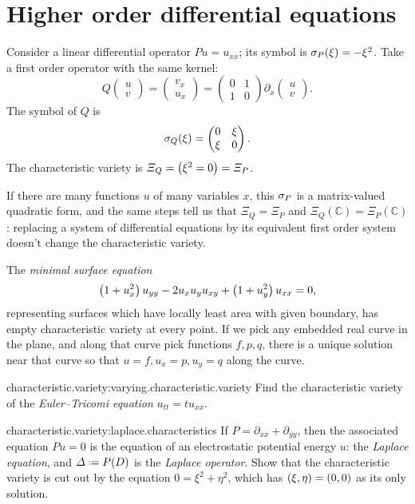 \section{Higher order differential equations}
\begin{example}
Consider a linear differential operator \(Pu=u_{xx}\); its symbol is \(\opsymbol[P]{\xi}=-\xi^2\).
Take a first order operator with the same kernel:
\[
Q
\begin{pmatrix}
u \\
v
\end{pmatrix}
=
\begin{pmatrix}
v_x \\
u_x
\end{pmatrix}
=
\begin{pmatrix}
0 & 1 \\
1 & 0
\end{pmatrix}
\partial_x
\begin{pmatrix}
u \\
v 
\end{pmatrix}
.
\]
The symbol of \(Q\) is 
\[
\opsymbol[Q]{\xi}
=
\begin{pmatrix}
0 & \xi \\
\xi & 0
\end{pmatrix}.
\]
The characteristic variety is \(\Xi_Q=\left(\xi^2=0\right)=\Xi_P\).
\end{example}
If there are many functions \(u\) of many variables \(x\), this \(\opsymbol{P}\) is a matrix-valued quadratic form, and the same steps tell us that \(\Xi_Q=\Xi_P\) and \(\Xi_Q(\mathbb{C})=\Xi_P(\mathbb{C})\): replacing a system of differential equations by its equivalent first order system doesn't change the characteristic variety.
\begin{example}
The \emph{minimal surface equation}
\[
\left(1+u_x^2\right)u_{yy} - 2u_xu_yu_{xy} + \left(1+u_y^2\right)u_{xx}=0,
\]
representing surfaces which have locally least area with given boundary, has empty characteristic variety at every point.
If we pick any embedded real curve in the plane, and along that curve pick functions \(f, p, q\), there is a unique solution near that curve so that \(u=f, u_x=p, u_y=q\) along the curve.
\end{example}
\begin{problem}{characteristic.variety:varying.characteristic.variety}
Find the characteristic variety of the \emph{Euler--Tricomi equation}%
\(u_{tt}=tu_{xx}\).
\end{problem}
\begin{problem}{characteristic.variety:laplace.characteristics}
If \(P=\partial_{xx} + \partial_{yy}\), then the associated equation \(Pu=0\) is the equation of an electrostatic potential energy \(u\): the \emph{Laplace equation},%
and \(\Delta\defeq P(D)\) is the \emph{Laplace operator}.
Show that the characteristic variety is cut out by the equation \(0=\xi^2+\eta^2\), which has \(\left(\xi,\eta\right)=\left(0,0\right)\) as its only solution.
\end{problem}
